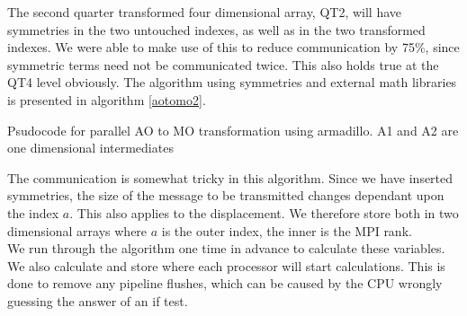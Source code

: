 \documentclass[a4paper,norsk,11pt,twoside]{report}
\begin{document}
The second quarter transformed four dimensional array, QT2, will have symmetries in the two untouched indexes, as well as in the two transformed indexes. We were able to make use of this to reduce communication by 75\%, since symmetric terms need not be communicated twice. This also holds true at the QT4 level obviously. The algorithm using symmetries and external math libraries is presented in algorithm \ref{aotomo2}. \\

\begin{algorithm}
  
 \caption{Psudocode for parallel AO to MO transformation using armadillo. A1 and A2 are one dimensional intermediates}
 \label{aotomo2}
\end{algorithm}

The communication is somewhat tricky in this algorithm. Since we have inserted symmetries, the size of the message to be transmitted changes dependant upon the index $a$. This also applies to the displacement. We therefore store both in two dimensional arrays where $a$ is the outer index, the inner is the MPI rank. \\

We run through the algorithm one time in advance to calculate these variables. We also calculate and store where each processor will start calculations. This is done to remove any pipeline flushes, which can be caused by the CPU wrongly guessing the answer of an if test. \\
\end{document}
